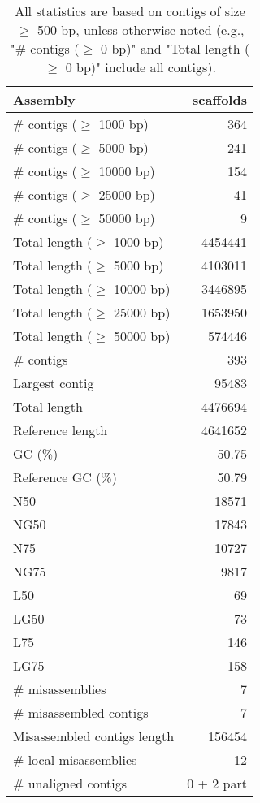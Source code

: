 \documentclass[12pt,a4paper]{article}
\begin{document}
\begin{table}[ht]
\begin{center}
\caption{All statistics are based on contigs of size $\geq$ 500 bp, unless otherwise noted (e.g., "\# contigs ($\geq$ 0 bp)" and "Total length ($\geq$ 0 bp)" include all contigs).}
\begin{tabular}{|l*{1}{|r}|}
\hline
Assembly & scaffolds \\ \hline
\# contigs ($\geq$ 1000 bp) & 364 \\ \hline
\# contigs ($\geq$ 5000 bp) & 241 \\ \hline
\# contigs ($\geq$ 10000 bp) & 154 \\ \hline
\# contigs ($\geq$ 25000 bp) & 41 \\ \hline
\# contigs ($\geq$ 50000 bp) & 9 \\ \hline
Total length ($\geq$ 1000 bp) & 4454441 \\ \hline
Total length ($\geq$ 5000 bp) & 4103011 \\ \hline
Total length ($\geq$ 10000 bp) & 3446895 \\ \hline
Total length ($\geq$ 25000 bp) & 1653950 \\ \hline
Total length ($\geq$ 50000 bp) & 574446 \\ \hline
\# contigs & 393 \\ \hline
Largest contig & 95483 \\ \hline
Total length & 4476694 \\ \hline
Reference length & 4641652 \\ \hline
GC (\%) & 50.75 \\ \hline
Reference GC (\%) & 50.79 \\ \hline
N50 & 18571 \\ \hline
NG50 & 17843 \\ \hline
N75 & 10727 \\ \hline
NG75 & 9817 \\ \hline
L50 & 69 \\ \hline
LG50 & 73 \\ \hline
L75 & 146 \\ \hline
LG75 & 158 \\ \hline
\# misassemblies & 7 \\ \hline
\# misassembled contigs & 7 \\ \hline
Misassembled contigs length & 156454 \\ \hline
\# local misassemblies & 12 \\ \hline
\# unaligned contigs & 0 + 2 part \\ \hline

\end{tabular}
\end{center}
\end{table}
\end{document}
